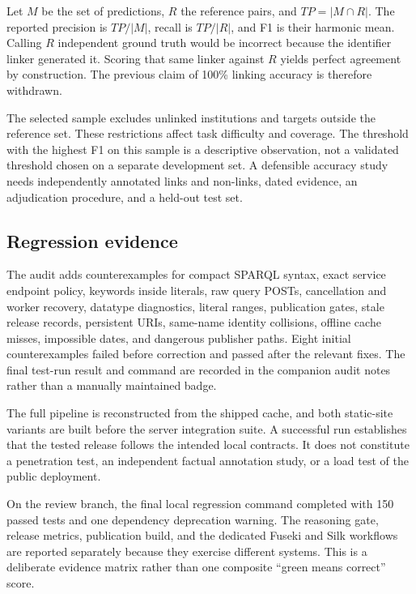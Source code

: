 \documentclass[11pt,a4paper]{article}
\begin{document}
Let $M$ be the set of predictions, $R$ the reference pairs, and $TP=|M\cap R|$.
The reported precision is $TP/|M|$, recall is $TP/|R|$, and F1 is their harmonic mean.
Calling $R$ independent ground truth would be incorrect because the identifier linker
generated it. Scoring that same linker against $R$ yields perfect agreement by construction.
The previous claim of 100\% linking accuracy is therefore withdrawn.

The selected sample excludes unlinked institutions and targets outside the reference set.
These restrictions affect task difficulty and coverage. The threshold with the highest F1
on this sample is a descriptive observation, not a validated threshold chosen on a separate
development set. A defensible accuracy study needs independently annotated links and
non-links, dated evidence, an adjudication procedure, and a held-out test set.



\subsection{Regression evidence}
The audit adds counterexamples for compact SPARQL syntax, exact service endpoint policy,
keywords inside literals, raw query POSTs, cancellation and worker recovery, datatype
diagnostics, literal ranges, publication gates, stale release records, persistent URIs,
same-name identity collisions, offline cache misses, impossible dates, and dangerous
publisher paths. Eight initial counterexamples failed before correction and passed after
the relevant fixes. The final test-run result and command are recorded in the companion
audit notes rather than a manually maintained badge.

The full pipeline is reconstructed from the shipped cache, and both static-site variants
are built before the server integration suite. A successful run establishes that the
tested release follows the intended local contracts. It does not constitute a penetration
test, an independent factual annotation study, or a load test of the public deployment.

On the review branch, the final local regression command completed with 150 passed tests
and one dependency deprecation warning. The reasoning gate, release metrics, publication
build, and the dedicated Fuseki and Silk workflows are reported separately because they
exercise different systems. This is a deliberate evidence matrix rather than one composite
``green means correct'' score.
\end{document}
